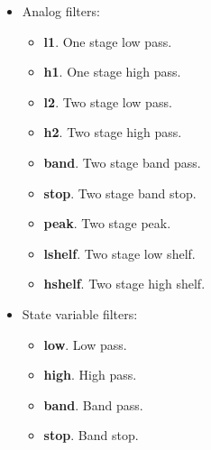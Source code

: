    \begin{itemize}
      \item Analog filters:
      \begin{itemize}
          \item \textbf{l1}. One stage low pass.
          \item \textbf{h1}. One stage high pass.
          \item \textbf{l2}. Two stage low pass.
          \item \textbf{h2}. Two stage high pass.
          \item \textbf{band}. Two stage band pass.
          \item \textbf{stop}. Two stage band stop.
          \item \textbf{peak}. Two stage peak.
          \item \textbf{lshelf}. Two stage low shelf.
          \item \textbf{hshelf}. Two stage high shelf.
      \end{itemize}
      \item State variable filters:
      \begin{itemize}
         \item \textbf{low}. Low pass.
         \item \textbf{high}. High pass.
         \item \textbf{band}. Band pass.
         \item \textbf{stop}. Band stop.
      \end{itemize}
   \end{itemize}

